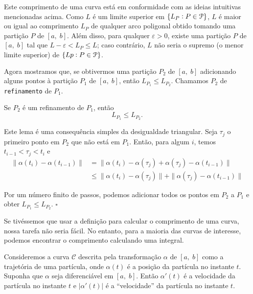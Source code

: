 Este comprimento de uma curva está em conformidade com as ideias intuitivas mencionadas acima. 
Como \(L\) é um limite superior em \(\{L_{P} \vcentcolon P \in \mathcal{P}\}\), \(L\) é maior ou igual ao comprimento \(L_{P}\) de qualquer arco poligonal obtido tomando uma partição \(P\) de \([a,\; 
b]\). Além disso, para qualquer \(\varepsilon > 0\), existe 
uma partição \(P\) de \([a,\;b]\) tal que \(L-\varepsilon < L_{P} \leq  L\); caso contrário, 
\(L\) não seria o supremo (o menor limite superior) de \(\{Lp \vcentcolon P \in \mathcal{P}\}\).
	
Agora mostramos que, se obtivermos uma partição \(P_{2}\) de \([a,\; b]\) adicionando alguns 
pontos à partição \(P_{1}\) de \([a,\;b]\), então \(L_{P_{1}}\leq L_{P_{2}}\). Chamamos \(P_{2}\) 
de \texttt{refinamento} de \(P_{1}\).

\begin{lema}
Se \(P_{2}\) é um refinamento de \(P_{1}\), então 
\begin{equation*}
L_{P_{1}} \leq  L_{P_{2}}.
\end{equation*}
\end{lema}

\prova Este lema é uma consequência simples da desigualdade triangular. Seja \(\tau_{j}\) o primeiro ponto em \(P_{2}\) que não está em \(P_{1}\). Então, para algum \(i\), temos  \(t_{i-1} < \tau_{j} < t_{i}\) e
\begin{align*}
\|\alpha(t_{i})-\alpha(t_{i-1})\|&=\|\alpha(t_{i})-\alpha(\tau_{j}) +\alpha(\tau_{j})-\alpha(t_{i-1})\| \\[2ex]
& \leq \|\alpha(t_{i})-\alpha(\tau_{j})\|+ \|\alpha(\tau_{j})-\alpha(t_{i-1})\|
\end{align*}

Por um número finito de passos, podemos adicionar todos os pontos em \(P_{2}\) a \(P_{1}\) e obter \(L_{P_{1}} \leq  L_{P_{2}}\). \hfill \(\square\)

Se tivéssemos que usar a definição para calcular o comprimento de uma curva, nossa tarefa não 
seria fácil. No entanto, para a maioria das curvas de interesse, podemos encontrar o comprimento 
calculando uma integral.

Consideremos a curva \(\mathcal{C}\) descrita pela transformação \(\alpha\) de \([a,\; b]\) como 
a trajetória de uma partícula, onde $\alpha(t)$ é a posição da partícula no instante \(t\). 
Suponha que \(\alpha\) seja diferenciável em \([a,\; b]\). Então \(\alpha'(t)\) é a velocidade da 
partícula no instante \(t\) e \(|\alpha'(t)|\) é a ``velocidade'' da partícula no instante \(t\). 

